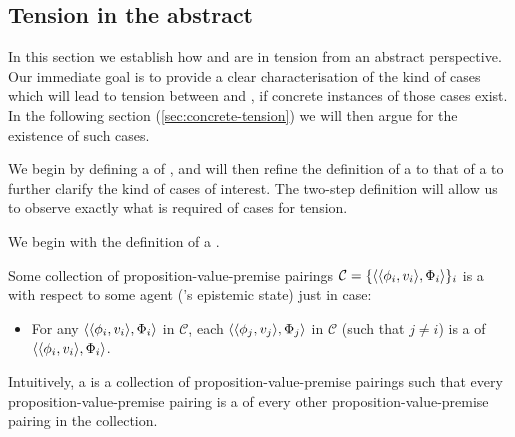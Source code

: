 \subsection{Tension in the abstract}
\label{sec:tension-abstract}

\begin{note}[Plan]
  In this section we establish how \csN{} and \ESU{} are in tension from an abstract perspective.
  Our immediate goal is to provide a clear characterisation of the kind of cases which will lead to tension between \csN{} and \ESU{}, if concrete instances of those cases exist.
  In the following section (\ref{sec:concrete-tension}) we will then argue for the existence of such cases.

  We begin by defining a  of , and will then refine the definition of a  to that of a \ragCluster{} to further clarify the kind of cases of interest.
  The two-step definition will allow us to observe exactly what is required of cases for tension.
\end{note}

\begin{note}[\requCluster{3}]
  We begin with the definition of a \cluster{}.
  \begin{definition}[A \requCluster{1}]
    \label{def:requCluster}
    Some collection of proposition-value-premise pairings \(\mathcal{C} = \{\langle \langle \phi_{i}, v_{i} \rangle, \Phi_{i} \rangle\}_{i}\) is a \emph{\cluster{}} with respect to some agent \vAgent{}('s epistemic state) just in case:
    \begin{itemize}
    \item
      For any \(\langle \langle \phi_{i}, v_{i} \rangle, \Phi_{i} \rangle\) in \(\mathcal{C}\), each \(\langle \langle \phi_{j}, v_{j} \rangle, \Phi_{j} \rangle\) in \(\mathcal{C}\) (such that \(j \ne i\)) is a \requ{} of \(\langle \langle \phi_{i}, v_{i} \rangle, \Phi_{i} \rangle\).
    \end{itemize}
    \vspace{-\baselineskip}
  \end{definition}

  Intuitively, a  is a collection of proposition-value-premise pairings such that every proposition-value-premise pairing is a \requ{} of every other proposition-value-premise pairing in the collection.
\end{note}

